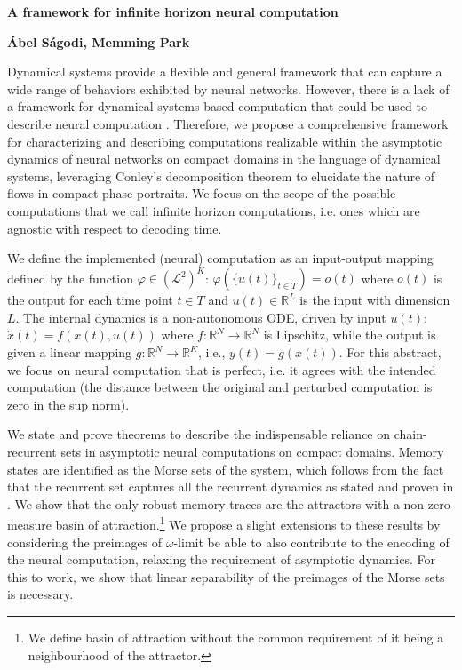 \documentclass[12pt,letterpaper, onecolumn]{article}
\theoremstyle{definition}
\theoremstyle{remark}
\newcommand{\reals}{\mathbb{R}}
\begin{document}

\begin{center}
\LARGE{\textbf{A framework for infinite horizon neural computation}}
\end{center}
\begin{center}
{\textbf{\'Abel S\'agodi, Memming Park}}
\end{center}

Dynamical systems provide a flexible and general framework that can capture a wide range of behaviors exhibited by neural networks.
However, there is a lack of a framework for dynamical systems based computation that could be used to describe neural computation \cite{jaeger2021}.
Therefore, we propose a comprehensive framework for characterizing and describing computations realizable within the asymptotic dynamics of neural networks on compact domains in the language of dynamical systems, leveraging Conley's decomposition theorem to elucidate the nature of flows in compact phase portraits.
We focus on the scope of the possible computations that we call infinite horizon computations, i.e. ones which are agnostic with respect to decoding time. 

We define the implemented (neural) computation as an input-output mapping defined by the function $\varphi\in (\mathcal{L}^2)^K$:
$\varphi(\{u(t)\}_{t\in T})=o(t)$
where $o(t)$ is the output for each time point $t\in T$ and  $u(t)\in \reals^L$ is the input with dimension $L$.
The internal dynamics is a non-autonomous ODE, driven by input $u(t)$: $\dot x(t) = f(x(t),u(t))$ where $f:\reals^N\rightarrow\reals^N$ is Lipschitz,
while the output is given a linear mapping $g:\reals^N\rightarrow\reals^K$, i.e., $y(t) = g(x(t))$.
For this abstract, we focus on neural computation that is perfect, i.e. it agrees with the intended computation (the distance between the original and perturbed computation is zero in the sup norm).
 
We state and prove theorems to describe the indispensable reliance on chain-recurrent sets in asymptotic neural computations on compact domains. Memory states are identified as the Morse sets \cite{mischaikow1999} of the system, which follows from the fact that the recurrent set captures all the recurrent dynamics as stated and proven in \cite[Chapter I.8.2]{conley1978}. We show that the only robust memory traces are the attractors with a non-zero measure basin of attraction.\footnote{We define basin of attraction without the common requirement of it being a neighbourhood of the attractor.}
We propose a slight extensions to these results by considering the preimages of $\omega$-limit be able to also contribute to the encoding of the neural computation, relaxing the requirement of asymptotic dynamics. For this to work, we show that linear separability of the preimages of the Morse sets is necessary.
\end{document}
